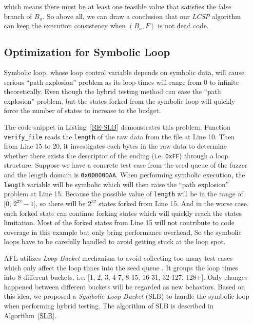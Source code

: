 \noindent which means there must be at least one feasible value that satisfies the false branch of $B_u$. So above all, we can draw a conclusion that our \emph{LCSP} algorithm can keep the execution consistency when $(B_u, F)$ is not dead code.

\subsection{Optimization for Symbolic Loop}
Symbolic loop, whose loop control variable depends on symbolic data, will cause serious ``path explosion'' problem as its loop times will range from 0 to infinite theoretically. 
Even though the hybrid testing method can ease the ``path explosion'' problem, but the states forked from the symbolic loop will quickly force the number of states to increase to the budget. 

 

The code snippet in Listing~\ref{RE-SLB} demonstrates this problem. Function \texttt{verify\_file} reads the \texttt{length} of the raw data from the file at Line 10. Then from Line 15 to 20, it investigates each bytes in the raw data to determine whether there exists the descriptor of the ending (i.e. \texttt{0xFF}) through a loop structure. Suppose we have a concrete test case from the seed queue of the fuzzer and the length domain is \texttt{0x000000AA}. 
When performing symbolic execution, the \texttt{length} variable will be symbolic which will then raise the ``path explosion'' problem at Line 15. Because the possible value of \texttt{length} will be in the range of [0, $2^{32}-1$], so there will be $2^{32}$ states forked from Line 15. And in the worse case, each forked state can continue forking states which will quickly reach the states limitation. 
Most of the forked states from Line 15 will not contribute to code coverage in this example but only bring performance overhead, So the symbolic loops have to be carefully handled to avoid getting stuck at the loop spot. 

AFL utilizes \emph{Loop Bucket} mechanism to avoid collecting too many test cases which only affect the loop times into the seed queue \cite{online:afl}. It groups the loop times into 8 different buckets, i.e. [1, 2, 3, 4-7, 8-15, 16-31, 32-127, 128+]. Only changes happened between different buckets will be regarded as new behaviors. Based on this idea, we proposed a \textit{Symbolic Loop Bucket} (SLB) to handle the symbolic loop when performing hybrid testing. The algorithm of SLB is described in Algorithm~\ref{SLB}.

